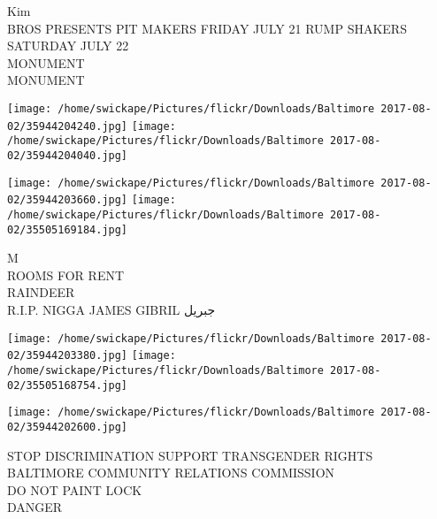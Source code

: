 \documentclass[10pt,letterpaper]{article}
\begin{document}
Kim\\
BROS PRESENTS PIT MAKERS FRIDAY JULY 21 RUMP SHAKERS SATURDAY JULY 22\\
MONUMENT\\
MONUMENT
\pagebreak

\texttt{[image: /home/swickape/Pictures/flickr/Downloads/Baltimore 2017-08-02/35944204240.jpg]}
\texttt{[image: /home/swickape/Pictures/flickr/Downloads/Baltimore 2017-08-02/35944204040.jpg]}

\texttt{[image: /home/swickape/Pictures/flickr/Downloads/Baltimore 2017-08-02/35944203660.jpg]}
\texttt{[image: /home/swickape/Pictures/flickr/Downloads/Baltimore 2017-08-02/35505169184.jpg]}

M\\
ROOMS FOR RENT\\
RAINDEER\\
R.I.P. NIGGA JAMES GIBRIL جبريل
\pagebreak

\texttt{[image: /home/swickape/Pictures/flickr/Downloads/Baltimore 2017-08-02/35944203380.jpg]}
\texttt{[image: /home/swickape/Pictures/flickr/Downloads/Baltimore 2017-08-02/35505168754.jpg]}

\texttt{[image: /home/swickape/Pictures/flickr/Downloads/Baltimore 2017-08-02/35944202600.jpg]}

STOP DISCRIMINATION SUPPORT TRANSGENDER RIGHTS BALTIMORE COMMUNITY RELATIONS COMMISSION\\
DO NOT PAINT LOCK\\
DANGER
\pagebreak
\end{document}

